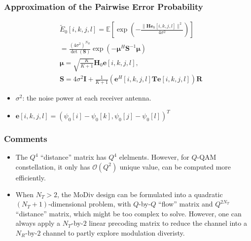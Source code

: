 \documentclass{beamer}
\begin{document}
\begin{frame}
  \frametitle{Approximation of the Pairwise Error Probability}
  \begin{align*}
    & \tilde{E}_0[i,k,j,l] = \mathbb{E}\left[\exp\left(-\frac{\|\mathbf{H}
    \mathbf{e}_0[i,k,j,l]\|^2}{4\sigma^2}\right)\right]\\
    &= \frac{(4\sigma^2)^{N_R}}{\det(\mathbf{S})}
        \exp\left(-\bm{\mu}^H\mathbf{S}^{-1}
        \bm{\mu}\right) \\
    & \bm{\mu} = \sqrt{\frac{K}{K+1}}\mathbf{H}_0\mathbf{e}[i,k,j,l],\\
    & \mathbf{S} = 4\sigma^2\mathbf{I} + \frac{1}{K + 1}
    (\mathbf{e}^H[i,k,j,l]\mathbf{T}\mathbf{e}[i,k,j,l])\mathbf{R}
  \end{align*}
  \begin{itemize}
    \item $\sigma^2$: the noise power at each receiver antenna.
    \item $\mathbf{e}[i,k,j,l] = (\psi_0[i] - \psi_0[k], \psi_0[j] -
    \psi_0[l])^T$
  \end{itemize}
\end{frame}

\begin{frame}
  \frametitle{Comments}
  
  \begin{itemize}
    \item The $Q^4$ ``distance'' matrix has $Q^4$ elelments. However, for
    $Q$-QAM constellation, it only has $\mathcal{O}(Q^2)$ unique value, can be
    computed more efficiently.
    \item When $N_T > 2$, the MoDiv design can be formulated into a quadratic
    $(N_T + 1)$-dimensional problem, with $Q$-by-$Q$ ``flow'' matrix and $Q ^
    {2N_T}$ ``distance'' matrix, which might be too complex to solve. However,
    one can always apply a $N_T$-by-$2$ linear precoding matrix to reduce the
    channel into a $N_R$-by-$2$ channel to partly explore modulation diveristy.
  \end{itemize}
\end{frame}
\end{document}
